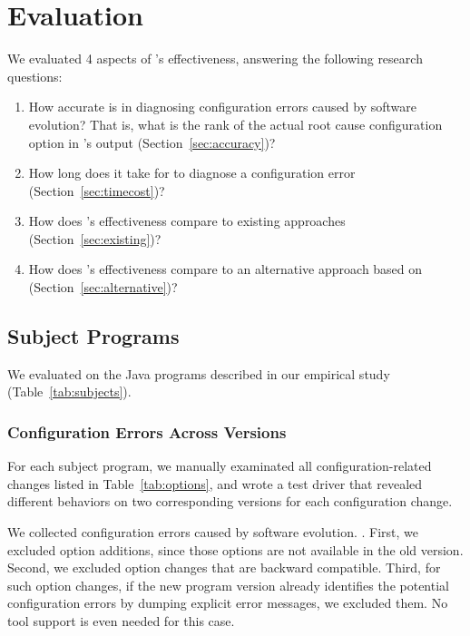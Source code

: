 
\section{Evaluation}
\label{sec:evaluation}

We evaluated 4 aspects of \ourtool's effectiveness, answering
the following research questions:

\begin{enumerate}
\item How accurate is \ourtool in diagnosing configuration errors
caused by software evolution? That is, what is the rank of the
actual root cause configuration option in \ourtool's output (Section~\ref{sec:accuracy})?

\item How long does it take for \ourtool to diagnose
a configuration error (Section~\ref{sec:timecost})?

\item How does \ourtool's effectiveness compare to
existing approaches (Section~\ref{sec:existing})?

\item How does \ourtool's effectiveness compare to
an alternative approach based on  (Section~\ref{sec:alternative})?

\end{enumerate}

\subsection{Subject Programs}

We evaluated \ourtool on the \subjnum Java programs
described in our empirical study (Table~\ref{tab:subjects}).

\subsubsection{Configuration Errors Across Versions}



For each subject program, we manually examinated all
configuration-related changes listed in Table~\ref{tab:options},
and wrote a test driver that revealed different
behaviors on two corresponding versions for each configuration change.

We collected \errornum configuration errors caused by
software evolution. . First, we excluded option additions, since
those options are not available in the old version.
Second, we excluded option changes that are backward
compatible. Third, for such option changes, if the
new program version already identifies the potential
configuration errors by dumping explicit error messages,
we excluded them. No tool support is even needed
for this case.

